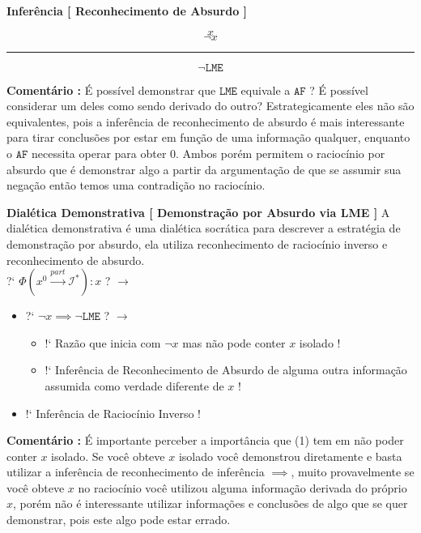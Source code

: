 \documentclass[10pt,a4paper]{report}
\begin{document}
\textbf{Inferência [ Reconhecimento de Absurdo ]}

$$ x $$
$$ \neg x $$
\hrule
$$ \neg \texttt{LME} $$

\textbf{Comentário :} É possível demonstrar que $\texttt{LME}$ equivale a $\texttt{AF}$ ? É possível considerar um deles como sendo derivado do outro? Estrategicamente eles não são equivalentes, pois a inferência de reconhecimento de absurdo é mais interessante para tirar conclusões por estar em função de uma informação qualquer, enquanto o $\texttt{AF}$ necessita operar para obter $0$. Ambos porém permitem o raciocínio por absurdo que é demonstrar algo a partir da argumentação de que se assumir sua negação então temos uma contradição no raciocínio.

\hspace{\baselineskip}

\textbf{Dialética Demonstrativa [ Demonstração por Absurdo via LME ]} A dialética demonstrativa é uma dialética socrática para descrever a estratégia de demonstração por absurdo, ela utiliza reconhecimento de raciocínio inverso e reconhecimento de absurdo. \\

?` $\Phi( x^0 \overset{part}{\rightarrow} \mathcal{I}^* ) : x $  ? $\rightarrow$

\begin{itemize}
	\item[ ] ?` $ \neg x \implies \neg \texttt{LME} $ ? $\rightarrow$
	\begin{itemize}
		\item[ (1) ] !` Razão que inicia com $\neg x$ mas não pode conter $x$ isolado !
		\item[ (2) ] !` Inferência de Reconhecimento de Absurdo de alguma outra informação assumida como verdade diferente de $x$ !
	\end{itemize}
	\item[ ] !` Inferência de Raciocínio Inverso !
\end{itemize}

\textbf{Comentário :} É importante perceber a importância que (1) tem em não poder conter $x$ isolado. Se você obteve $x$ isolado você demonstrou diretamente e basta utilizar a inferência de reconhecimento de inferência $\implies$, muito provavelmente se você obteve $x$ no raciocínio você utilizou alguma informação derivada do próprio $x$, porém não é interessante utilizar informações e conclusões de algo que se quer demonstrar, pois este algo pode estar errado.\\
\end{document}
